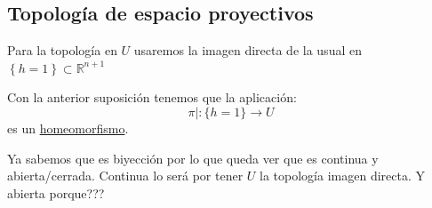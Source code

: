 \subsection{Topología de espacio proyectivos}
\label{sub:topología_de_espacio_proyectivos}
Para la topología en $U$ usaremos la imagen directa de la usual en $\left\{ h = 1 \right\} \subset \mathbb{R}^{n+1}$
\begin{prop}
Con la anterior suposición tenemos que la aplicación:
\[
\pi|: \{h = 1\} \rightarrow U
\]
es un \underline{homeomorfismo}.     
\end{prop}
\begin{demo}
Ya sabemos que es biyección por lo que queda ver que es continua y abierta/cerrada. Continua lo será por tener $U$ la topología imagen directa. Y abierta porque???%
\end{demo}

